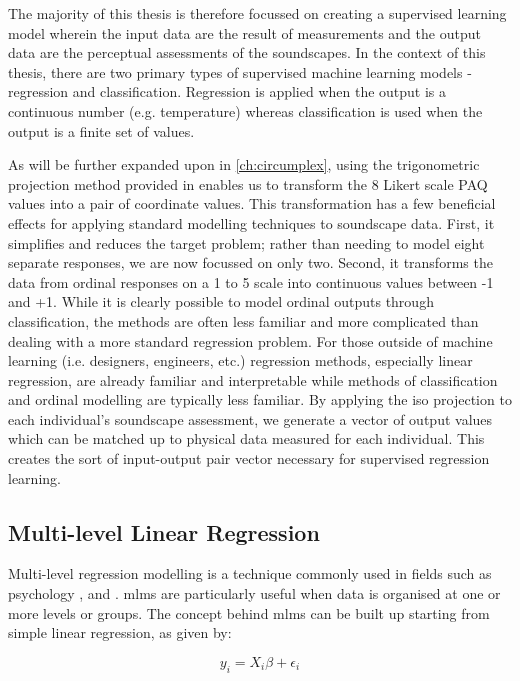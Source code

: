 The majority of this thesis is therefore focussed on creating a supervised learning model wherein the input data are the result of measurements and the output data are the perceptual assessments of the soundscapes. In the context of this thesis, there are two primary types of supervised machine learning models - regression and classification. Regression is applied when the output is a continuous number (e.g. temperature) whereas classification is used when the output is a finite set of values. 

As will be further expanded upon in \cref{ch:circumplex}, using the trigonometric projection method provided in \citet{ISO12913Part3} enables us to transform the 8 Likert scale PAQ values into a pair of coordinate values. This transformation has a few beneficial effects for applying standard modelling techniques to soundscape data. First, it simplifies and reduces the target problem; rather than needing to model eight separate responses, we are now focussed on only two. Second, it transforms the data from ordinal responses on a 1 to 5 scale into continuous values between -1 and +1. While it is clearly possible to model ordinal outputs through classification, the methods are often less familiar and more complicated than dealing with a more standard regression problem. For those outside of machine learning (i.e. designers, engineers, etc.) regression methods, especially linear regression, are already familiar and interpretable while methods of classification and ordinal modelling are typically less familiar. By applying the \gls{iso} projection to each individual's soundscape assessment, we generate a vector of output values which can be matched up to physical data measured for each individual. This creates the sort of input-output pair vector necessary for supervised regression learning.

\subsection{Multi-level Linear Regression}

Multi-level regression modelling is a technique commonly used in fields such as psychology , and . \glspl{mlm} are particularly useful when data is organised at one or more levels or groups. The concept behind \glspl{mlm} can be built up starting from simple linear regression, as given by:

\begin{equation}
  y_i = X_i\beta + \epsilon_i
\end{equation}

